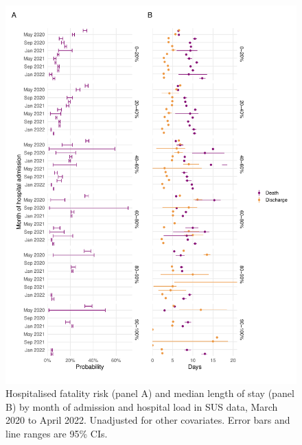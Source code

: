 \begin{figure}[htbp!]
    \centering
    \includegraphics[width=\textwidth]{hfr_month_load.pdf}
    \caption[Hospitalised fatality risk and median length of stay by month of admission and hospital load in SUS data, March 2020 to April 2022]{Hospitalised fatality risk (panel A) and median length of stay (panel B) by month of admission and hospital load in SUS data, March 2020 to April 2022. Unadjusted for other covariates. Error bars and line ranges are 95\% CIs.}\label{fig:hfr-month-load}
\end{figure}

